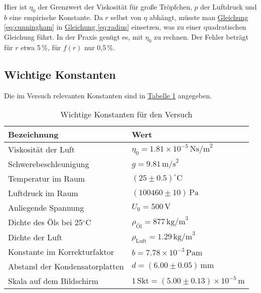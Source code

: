 Hier ist $\eta_0$ der Grenzwert der Viskosität für große Tröpfchen, $p$ der Luftdruck und $b$ eine empirische Konstante. Da $r$ selbst von $\eta$ abhängt, müsste man \hyperref[eq:cunningham]{Gleichung \ref*{eq:cunningham}} in \hyperref[eq:radius]{Gleichung \ref*{eq:radius}} einsetzen, was zu einer quadratischen Gleichung führt. In der Praxis genügt es, mit $\eta_0$ zu rechnen. Der Fehler beträgt für $r$ etwa 5\,\%, für $f(r)$ nur 0,5\,\%.

\subsection*{Wichtige Konstanten}
Die im Versuch relevanten Konstanten sind in \hyperref[tab:konstanten]{Tabelle \ref*{tab:konstanten}} angegeben.

\begin{table}[h!]
\centering
\begin{tabular}{ll}
\hline
Bezeichnung & Wert \\
\hline
Viskosität der Luft & $\eta_0 = 1.81 \times 10^{-5}\,\text{Ns/m}^2$ \\
Schwerebeschleunigung & $g = 9.81\,\text{m/s}^2$ \\
Temperatur im Raum & $(25 \pm 0.5)^{\circ}\text{C}$ \\
Luftdruck im Raum & $(100460 \pm 10)\,\text{Pa}$ \\
Anliegende Spannung & $U_0 = 500\,\text{V}$ \\
Dichte des Öls bei 25$^{\circ}$C & $\rho_\text{Öl} = 877\,\text{kg/m}^3$ \\
Dichte der Luft & $\rho_\text{Luft} = 1.29\,\text{kg/m}^3$ \\
Konstante im Korrekturfaktor & $b = 7.78 \times 10^{-3}\,\text{Pam}$ \\
Abstand der Kondensatorplatten & $d = (6.00 \pm 0.05)\,\text{mm}$ \\
Skala auf dem Bildschirm & $1\,\text{Skt} = (5.00 \pm 0.13)\times 10^{-5}\,\text{m}$ \\
\hline
\end{tabular}
\caption{Wichtige Konstanten für den Versuch}
\label{tab:konstanten}
\end{table}
